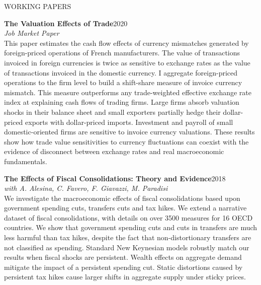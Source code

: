 \documentclass{resume} %
\begin{document}
\begin{rSection}{WORKING PAPERS}

{\textbf{The Valuation Effects of Trade}\hfill{2020}}\\\textit{Job Market Paper}\\
{This paper estimates the cash flow effects of currency mismatches generated by foreign-priced operations of French manufacturers. The value of transactions invoiced in foreign currencies is twice as sensitive to exchange rates as the value of transactions invoiced in the domestic currency. I aggregate foreign-priced operations to the firm level to build a shift-share measure of invoice currency mismatch. This measure outperforms any trade-weighted effective exchange rate index at explaining cash flows of trading firms. Large firms absorb valuation shocks in their balance sheet and small exporters partially hedge their dollar-priced exports with dollar-priced imports. Investment and payroll of small domestic-oriented firms are sensitive to invoice currency valuations.  These results show how trade value sensitivities to currency fluctuations can coexist with the evidence of disconnect between exchange rates and real macroeconomic fundamentals.}


\bigskip

\textbf{The Effects of Fiscal Consolidations: Theory and Evidence}\hfill2018\\
\textit{with A. Alesina, C. Favero, F. Giavazzi, M. Paradisi}\\
{We investigate the macroeconomic effects of fiscal consolidations based upon government spending cuts, transfers cuts and tax hikes. We extend a narrative dataset of fiscal consolidations, with details on over 3500 measures for 16 OECD countries. We show that government spending cuts and cuts in transfers are 	much less harmful than tax hikes, despite the fact that non-distortionary transfers are not classified as spending. Standard New Keynesian models robustly match our results when fiscal shocks are persistent. 	Wealth effects on aggregate demand mitigate the impact of a persistent spending cut. Static distortions caused by persistent tax hikes cause larger shifts in aggregate supply under sticky prices.}

\end{rSection} 



\end{document}
